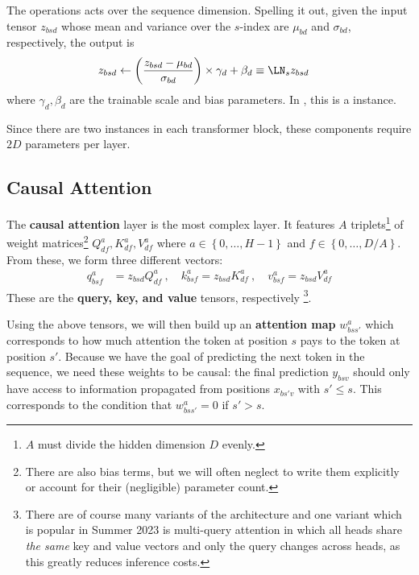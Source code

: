 \documentclass[11pt]{article}
\begin{document}
The  operations acts over the sequence dimension. Spelling it out, given the
input tensor $ z _{ bsd } $ whose mean and variance over the $ s $-index are $ \mu _{ bd } $ and $
\sigma _{ bd } $, respectively, the  output is
\begin{align}
  z _{ bsd } &\leftarrow \left ( \frac{ z _{ bsd } - \mu _{ bd } }{ \sigma _{ bd } } \right )\times \gamma _{ d }
  + \beta _{ d } \equiv \LN _{ s } z _{ bsd}
\end{align}
where $ \gamma _{ d }, \beta  _{ d } $ are the trainable scale and bias parameters. In
, this is a  instance.

Since there are two  instances in each transformer block, these components require
$ 2D $ parameters per layer.


\subsection{Causal Attention \label{subsubsec_attn_layer} }

The \textbf{causal attention} layer is the most complex layer. It features $ A $  triplets\footnote{$ A $
must divide the hidden dimension $ D $ evenly.} of weight matrices\footnote{There are also bias
terms, but we will often neglect to write them explicitly or account for their (negligible)
parameter count.}  $ Q ^{ a } _{ d f }, K ^{ a } _{ df }, V ^{ a } _{ df }  $
where $ a \in \left \{ 0, \ldots, H-1 \right \} $ and $ f \in \left \{ 0, \ldots, D/A \right \} $.
From these, we form three different vectors:
\begin{align}
  q ^{ a }_{ bsf } &= z _{ bsd } Q ^{ a }_{ df } \ , \quad
  k ^{ a }_{ bsf } = z _{ bsd } K ^{ a }_{ df }  \ , \quad
  v ^{ a }_{ bsf } = z _{ bsd } V ^{ a }_{ df }
\end{align}
These are the \textbf{query, key, and value} tensors, respectively \footnote{There are of course
many variants of the architecture and one variant which is popular in Summer 2023 is multi-query
attention \cite{shazeer2019fast} in which all heads share \textit{the same} key and value vectors
and only the query changes across heads, as this greatly reduces inference costs.}.

Using the above tensors, we will then build up an \textbf{attention map}  $ w ^{ a }_{ bss' } $
which corresponds to how much attention the token at position $ s $ pays to the token at
position $ s' $.  Because we have the goal of predicting the
next token in the sequence, we need these weights to be causal: the final prediction $ y _{ bsv } $
should only have access to information propagated from positions $ x _{ bs'v } $ with $ s' \le s $.
This corresponds to the condition that $ w ^{ a }_{ bss' } = 0  $ if  $ s' > s  $.
\end{document}
